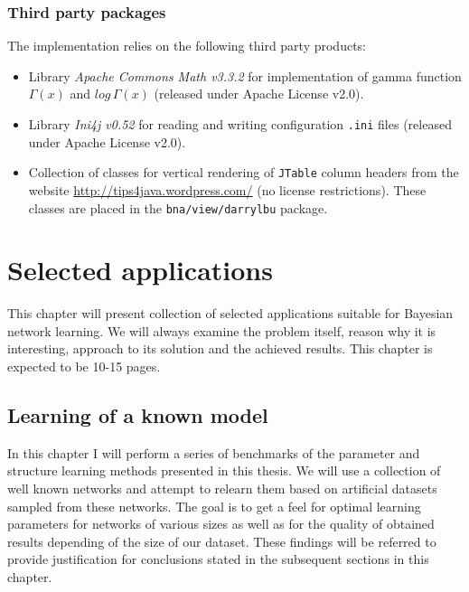 \documentclass[english,cover]{fitthesis} %
\newcommand{\term}[1]{\emph{#1}}           %
\newcommand{\srccode}[1]{{\tt #1}}         %
\newcommand{\todo}[1]{{\color{red}#1}}
\begin{document}
\subsection{Third party packages}
The implementation relies on the following third party products:
\begin{itemize}
    \item Library \term{Apache Commons Math v3.3.2} for implementation of gamma function $\Gamma(x)$ and $log \, \Gamma(x)$ (released under Apache License v2.0).
	\item Library \term{Ini4j v0.52} for reading and writing configuration \srccode{.ini} files (released under Apache License v2.0).
	\item Collection of classes for vertical rendering of \srccode{JTable} column headers from the website \url{http://tips4java.wordpress.com/} (no license restrictions). These classes are placed in the \srccode{bna/view/darrylbu} package.
\end{itemize}





















\chapter{Selected applications}\label{ch:practical}
This chapter will present collection of selected applications suitable for Bayesian network learning. We will always examine the problem itself, reason why it is interesting, approach to its solution and the achieved results. \todo{This chapter is expected to be 10-15 pages.}

\section{Learning of a known model}
In this chapter I will perform a series of benchmarks of the parameter and structure learning methods presented in this thesis. We will use a collection of well known networks and attempt to relearn them based on artificial datasets sampled from these networks. The goal is to get a feel for optimal learning parameters for networks of various sizes as well as for the quality of obtained results depending of the size of our dataset. These findings will be referred to provide justification for conclusions stated in the subsequent sections in this chapter.
\end{document}
